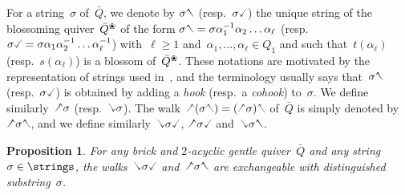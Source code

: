 \documentclass{amsart}
\newtheorem{proposition}[theorem]{Proposition}
\theoremstyle{definition}
\newcommand{\darkblue}{\color{darkblue}} %
\newcommand{\defn}[1]{\textsl{\darkblue #1}} %
\newcommand{\quiver}{\bar Q} %
\newcommand{\blossom}{^\text{\ding{96}}} %
\newcommand{\hL}{\text{\rotatebox[origin=c]{180}{\checked}}}
\newcommand{\hR}{\text{\rotatebox[origin=c]{180}{\reflectbox{\checked}}}}
\newcommand{\cL}{\text{\reflectbox{\checked}}}
\newcommand{\cR}{\text{\checked}}
\newcommand{\hh}[1]{\hL#1\hR} %
\newcommand{\cc}[1]{\cL#1\cR} %
\newcommand{\hc}[1]{\hL#1\cR} %
\newcommand{\ch}[1]{\cL#1\hR} %
\begin{document}
For a string~$\sigma$ of~$\quiver$, we denote by $\sigma\hR$ (resp.~$\sigma\cR$) the unique string of the blossoming quiver~$\quiver\blossom$ of the form $\sigma\hR = \sigma \alpha_1^{-1} \alpha_2 \dots \alpha_\ell$ (resp.~$\sigma\cR = \sigma \alpha_1 \alpha_2^{-1} \dots \alpha_\ell^{-1}$) with~$\ell \ge 1$ and~${\alpha_1, \dots, \alpha_\ell \in Q_1}$ and such that~$t(\alpha_\ell)$ (resp.~$s(\alpha_\ell)$) is a blossom of~$\quiver\blossom$.
These notations are motivated by the representation of strings used in~\cite{ButlerRingel, PaluPilaudPlamondon-nonkissing}, and the terminology usually says that~$\sigma\hR$ (resp.~$\sigma\cR$) is obtained by adding a \defn{hook} (resp.~a \defn{cohook}) to~$\sigma$.
We define similarly~$\hL\sigma$ (resp.~$\cL\sigma$).
The walk~$\hL(\sigma\hR) = (\hL\sigma)\hR$ of~$\quiver$ is simply denoted by~$\hh{\sigma}$, and we define similarly~$\cc{\sigma}$, $\hc{\sigma}$ and~$\ch{\sigma}$.

\begin{proposition}
\label{prop:interestingExchangeablePairsNKC}
For any brick and $2$-acyclic gentle quiver~$\quiver$ and any string~$\sigma \in \strings$, the walks~$\cc{\sigma}$ and~$\hh{\sigma}$ are exchangeable with distinguished substring~$\sigma$.
\end{proposition}
\end{document}

